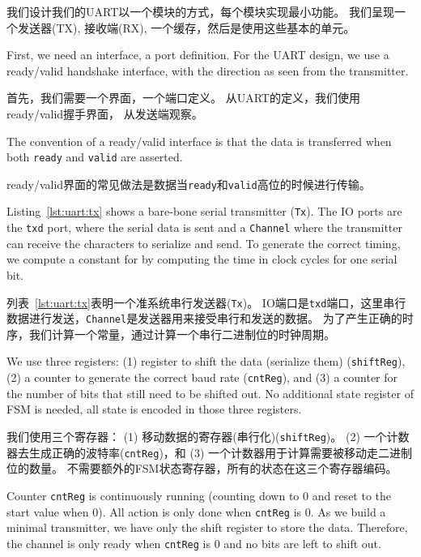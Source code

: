 \documentclass[%
    10pt,
    headinclude, footexclude,
    openright, %
    notitlepage,
    cleardoubleempty,
    headsepline,
    pointlessnumbers,
    bibtotoc, idxtotoc,
    ]{scrbook}
\newcommand{\code}[1]{{\small{\texttt{#1}}}}
\begin{document}
我们设计我们的UART以一个模块的方式，每个模块实现最小功能。
我们呈现一个发送器(TX), 接收端(RX),
一个缓存，然后是使用这些基本的单元。

First, we need an interface, a port definition.
For the UART design, we use a ready/valid handshake interface,
with the direction as seen from the transmitter.

首先，我们需要一个界面，一个端口定义。
从UART的定义，我们使用ready/valid握手界面，
从发送端观察。


The convention of a ready/valid interface is that the data is transferred
when both \code{ready} and \code{valid} are asserted.

ready/valid界面的常见做法是数据当\code{ready}和\code{valid}高位的时候进行传输。


Listing~\ref{lst:uart:tx} shows a bare-bone serial transmitter (\code{Tx}).
The IO ports are the \code{txd} port, where the serial data is sent and
a \code{Channel} where the transmitter can receive the characters to serialize
and send.
To generate the correct timing, we compute a constant for by computing
the time in clock cycles for one serial bit.

列表~\ref{lst:uart:tx}表明一个准系统串行发送器(\code{Tx})。
IO端口是\code{txd}端口，这里串行数据进行发送，\code{Channel}是发送器用来接受串行和发送的数据。
为了产生正确的时序，我们计算一个常量，通过计算一个串行二进制位的时钟周期。

We use three registers:
(1) register to shift the data (serialize them) (\code{shiftReg}),
(2) a counter to generate the correct baud rate (\code{cntReg}), and
(3) a counter for the number of bits that still need to be shifted out.
No additional state register of FSM is needed, all state is encoded in
those three registers.

我们使用三个寄存器：
(1) 移动数据的寄存器(串行化)(\code{shiftReg})。
(2) 一个计数器去生成正确的波特率(\code{cntReg})，和
(3) 一个计数器用于计算需要被移动走二进制位的数量。
不需要额外的FSM状态寄存器，所有的状态在这三个寄存器编码。

Counter \code{cntReg} is continuously running (counting down to 0
and reset to the start value when 0). All action is only done when
\code{cntReg} is 0. As we build a minimal transmitter, we have only
the shift register to store the data. Therefore, the channel is only ready
when \code{cntReg} is 0 and no bits are left to shift out.
\end{document}
